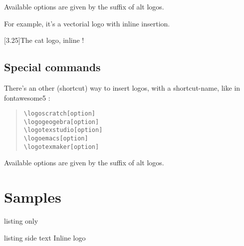\documentclass[11pt,a4paper]{ltxdoc}
\begin{document}
Available \textsf{options} are given by the suffix of alt logos.


\begin{tcblisting}{}
{\Large\sffamily For example, it's a vectorial logo  with inline insertion.}
\end{tcblisting}

\begin{tcblisting}{}
\scalebox{3.25}[3.25]{\ttfamily The cat  logo, inline !}
\end{tcblisting}

\subsection{Special commands}

There's an other (shortcut) way to insert logos, with a shortcut-name, like in \textsf{fontawesome5} :

\begin{quote}
\begin{verbatim}
\logoscratch[option]
\logogeogebra[option]
\logotexstudio[option]
\logoemacs[option]
\logotexmaker[option]
\end{verbatim}
\end{quote}

Available options are given by the suffix of alt logos.

\pagebreak

\section{Samples}

\begin{tcblisting}{listing only}
\newcommand\samplevectorlogo[1]{{\LARGE Inline {#1} logo}\par}
\end{tcblisting}

\newcommand\samplevectorlogo[1]{{\LARGE Inline {#1} logo}\par}

\begin{tcblisting}{listing side text}
\samplevectorlogo{\logogeogebra}
\end{tcblisting}
\end{document}
